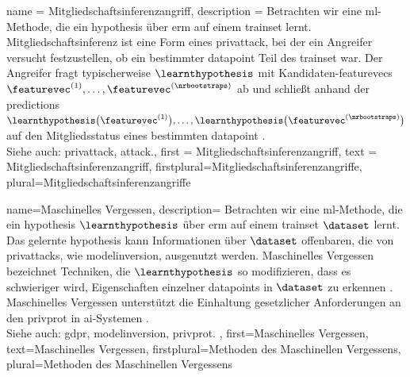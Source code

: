 {{{{
{name = {Mitgliedschaftsinferenzangriff}, 
 description = {Betrachten wir eine \gls{ml}-Methode, die ein \gls{hypothesis} 
 über \gls{erm} auf einem \gls{trainset} lernt. Mitgliedschaftsinferenz 
 ist eine Form eines \gls{privattack}, bei der ein Angreifer versucht festzustellen, ob ein 
 bestimmter \gls{datapoint} Teil des \gls{trainset} war. Der Angreifer fragt typischerweise $\learnthypothesis$ mit 
 Kandidaten-\glspl{featurevec} $\featurevec^{(1)},\ldots,\featurevec^{(\nrbootstraps)}$ ab und schließt 
 anhand der \glspl{prediction} $\learnthypothesis\big(\featurevec^{(1)}\big),\ldots, \learnthypothesis\big(\featurevec^{(\nrbootstraps)}\big)$ 
 auf den Mitgliedsstatus eines bestimmten \gls{datapoint} \cite{Shokri2017}.\\ 
		Siehe auch: \gls{privattack}, \gls{attack}.}, 
 first = {Mitgliedschaftsinferenzangriff}, 
 text = {Mitgliedschaftsinferenzangriff},
 firstplural={Mitgliedschaftsinferenzangriffe},
 plural={Mitgliedschaftsinferenzangriffe}
}


{name={Maschinelles Vergessen},
 description={
	Betrachten wir eine \gls{ml}-Methode, die ein \gls{hypothesis} $\learnthypothesis$ über \gls{erm} 
	auf einem \gls{trainset} $\dataset$ lernt. Das gelernte \gls{hypothesis} kann Informationen 
	über $\dataset$ offenbaren, die von \glspl{privattack}, wie \gls{modelinversion}, ausgenutzt werden. 
	Maschinelles Vergessen  bezeichnet Techniken, die $\learnthypothesis$ so
	modifizieren, dass es schwieriger wird, Eigenschaften einzelner \glspl{datapoint} in $\dataset$ zu 
	erkennen \cite{cao2015unlearning}. Maschinelles Vergessen unterstützt die Einhaltung gesetzlicher
	 Anforderungen an den \gls{privprot} in \gls{ai}-Systemen \cite{GDPR2016}.\\
		Siehe auch: \gls{gdpr}, \gls{modelinversion}, \gls{privprot}. },
	first={Maschinelles Vergessen},
	text={Maschinelles Vergessen},
	firstplural={Methoden des Maschinellen Vergessens},
	plural={Methoden des Maschinellen Vergessens}
}

}}}}
